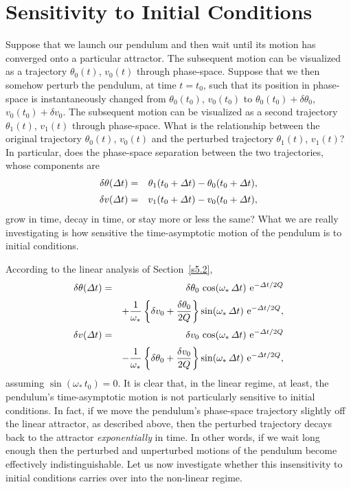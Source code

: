 \section{Sensitivity to Initial Conditions}
Suppose that we launch  our pendulum  and then wait until its motion has converged onto
a particular attractor. The subsequent motion can be visualized as a
trajectory $\theta_0(t)$, $v_0(t)$ through phase-space. Suppose that we then somehow
perturb the pendulum, at time $t=t_0$, such that its position in phase-space
is instantaneously changed from  $\theta_0(t_0)$, $v_0(t_0)$ to $\theta_0(t_0)+\delta\theta_0$, $v_0(t_0)
+\delta v_0$. The subsequent motion can be visualized as a second trajectory
   $\theta_1(t)$, $v_1(t)$ through phase-space. What is the relationship
between the original trajectory $\theta_0(t)$, $v_0(t)$ and the perturbed trajectory 
$\theta_1(t)$, $v_1(t)$?
In particular, does the phase-space separation between the two trajectories,
whose components are
\begin{eqnarray}
\delta\theta({\mit\Delta} t) &=& \theta_1(t_0+{\mit\Delta} t)-\theta_0(t_0+{\mit\Delta} t),\\[0.5ex]
\delta v({\mit\Delta} t) &=& v_1(t_0+{\mit\Delta} t)-v_0(t_0+{\mit\Delta} t),
\end{eqnarray}
grow in time,  decay in time, or stay more or less the same? What
we are really investigating is how sensitive  the time-asymptotic
 motion of the pendulum  is to initial conditions. 

According to the linear analysis of Section~\ref{s5.2},
\begin{eqnarray}
\delta\theta({\mit\Delta} t) &=& \delta\theta_0\,\cos(\omega_\ast\, {\mit\Delta} t)\,\,{\rm e}^{-{\mit\Delta} t/2Q}\nonumber\\[0.5ex]&&
+ \frac{1}{\omega_\ast}\left\{\delta v_0 + \frac{\delta\theta_0}{2Q}\right\}
\sin(\omega_\ast \,{\mit\Delta} t)\,\,{\rm e}^{-{\mit\Delta} t/2Q},\\[0.5ex]
\delta v({\mit\Delta} t) &=& \delta v_0\,\cos(\omega_\ast \,{\mit\Delta} t)\,\,{\rm e}^{-{\mit\Delta} t/2Q}
\nonumber\\[0.5ex]&&
- \frac{1}{\omega_\ast}\left\{\delta \theta_0 + \frac{\delta v_0}{2Q}\right\}
\sin(\omega_\ast \,{\mit\Delta} t)\,\,{\rm e}^{- {\mit\Delta} t/2Q},
\end{eqnarray}
assuming $\sin(\omega_\ast\,t_0)=0$.
It is clear that, in the linear regime, at least, the pendulum's 
time-asymptotic motion  is not particularly sensitive
to initial conditions. In fact, if we move the pendulum's phase-space trajectory slightly off
the linear attractor, as described above, then
 the perturbed
trajectory   decays  back to the attractor {\em exponentially}\/ in time.
In other words, if we wait long enough then the perturbed and unperturbed motions of the pendulum
become effectively indistinguishable. Let us now investigate whether this insensitivity to
initial conditions carries over into the non-linear regime.

